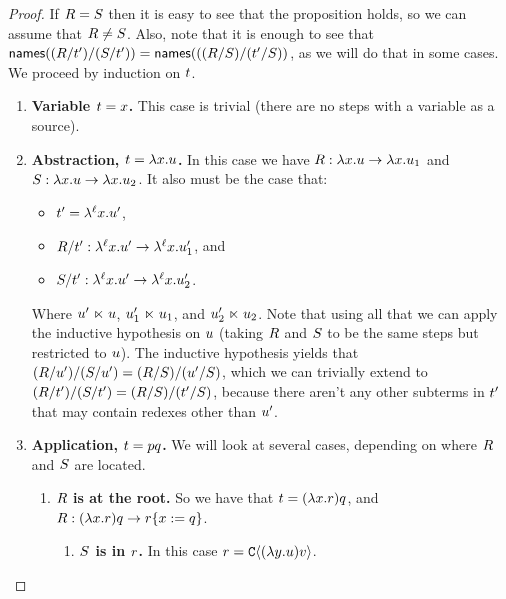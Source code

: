 \begin{proof}
If $R = S$ then it is easy to see that the proposition holds, so we can assume that $R \neq S$.
  Also, note that it is enough to see that $\mathsf{names}((R/t')/(S/t')) = \mathsf{names}(((R/S)/(t'/S))$, as we will do that in some cases.
We proceed by induction on $t$.
\begin{enumerate}
  \item {\bf Variable $t = x$.} This case is trivial (there are no steps with a variable as a source).
  \item {\bf Abstraction, $t = \lambda x. u$.}
    In this case we have $R : \lambda x. u \to \lambda x. u_1$ and
    $S : \lambda x. u \to \lambda x. u_2$.
    It also must be the case that:
      \begin{itemize}
        \item $t' = \lambda^{\ell} x. u'$,
        \item $R / t' : \lambda^{\ell} x. u' \to \lambda^{\ell} x. u_1'$, and
        \item $S / t' : \lambda^{\ell} x. u' \to \lambda^{\ell} x. u_2'$.
      \end{itemize}
    Where $u' \mathrel{\ltimes} u$, $u_1' \mathrel{\ltimes} u_1$, and $u_2' \mathrel{\ltimes} u_2$.
    Note that using all that we can apply the inductive hypothesis on $u$
    (taking $R$ and $S$ to be the same steps but restricted to $u$).
    The inductive hypothesis yields that
    $(R/u')/(S/u') = (R/S)/(u'/S)$,
    which we can trivially extend to
    $(R/t')/(S/t') = (R/S)/(t'/S)$,
    because there aren't any other subterms in $t'$ that may contain redexes other than $u'$.
  \item {\bf Application, $t = p q$.} We will look at several cases, depending on where
    $R$ and $S$ are located.
    \begin{enumerate}
      \item {\bf $R$ is at the root.} So we have that $t = (\lambda x. r) q$, and
        $R : (\lambda x. r) q \to r\{x := q\}$.
        \begin{enumerate}
          \item {\bf $S$ is in $r$.} In this case $r = \mathtt{C}\langle(\lambda y. u) v\rangle$.

\end{enumerate}
\end{enumerate}
\end{enumerate}
\end{proof}
